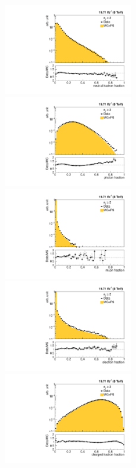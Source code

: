 \begin{figure}[!htbp]
  \begin{center}
    \includegraphics[width=0.5\textwidth]{Plots_HT_2_150/Qual/Comparison_NuHadFrac_2_HT_2_150.pdf}%
    \includegraphics[width=0.5\textwidth]{Plots_HT_2_150/Qual/Comparison_PhFrac_2_HT_2_150.pdf}\\
    \includegraphics[width=0.5\textwidth]{Plots_HT_2_150/Qual/Comparison_MuFrac_2_HT_2_150.pdf}%
    \includegraphics[width=0.5\textwidth]{Plots_HT_2_150/Qual/Comparison_ElFrac_2_HT_2_150.pdf}\\
    \includegraphics[width=0.5\textwidth]{Plots_HT_2_150/Qual/Comparison_ChHadFrac_2_HT_2_150.pdf}%

\end{center}
\end{figure}
